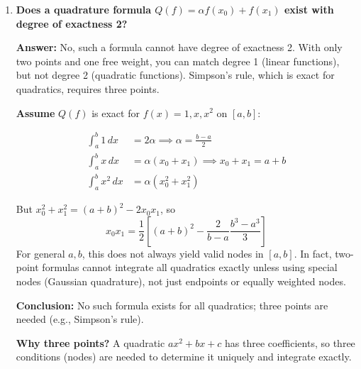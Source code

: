 \begin{enumerate}[label=(\alph*)]
    \item \textbf{Does a quadrature formula \( Q(f) = \alpha f(x_0) + f(x_1) \) exist with degree of exactness 2?}

    \textbf{Answer:} No, such a formula cannot have degree of exactness 2. With only two points and one free weight, you can match degree 1 (linear functions), but not degree 2 (quadratic functions). Simpson's rule, which is exact for quadratics, requires three points.

    \medskip

    \textbf{Assume} \( Q(f) \) is exact for \( f(x) = 1, x, x^2 \) on \([a, b]\):

    \begin{align*}
        \int_a^b 1\,dx &= 2\alpha \implies \alpha = \frac{b-a}{2} \\
        \int_a^b x\,dx &= \alpha(x_0 + x_1) \implies x_0 + x_1 = a + b \\
        \int_a^b x^2\,dx &= \alpha(x_0^2 + x_1^2)
    \end{align*}

    But \( x_0^2 + x_1^2 = (a+b)^2 - 2x_0 x_1 \), so
    \[
        x_0 x_1 = \frac{1}{2}\left[(a+b)^2 - \frac{2}{b-a}\frac{b^3-a^3}{3}\right]
    \]
    For general \( a, b \), this does not always yield valid nodes in \([a, b]\). In fact, two-point formulas cannot integrate all quadratics exactly unless using special nodes (Gaussian quadrature), not just endpoints or equally weighted nodes.

    \medskip

    \textbf{Conclusion:} No such formula exists for all quadratics; three points are needed (e.g., Simpson's rule).

    \medskip

    \textbf{Why three points?} A quadratic \( ax^2 + bx + c \) has three coefficients, so three conditions (nodes) are needed to determine it uniquely and integrate exactly.

\end{enumerate}
